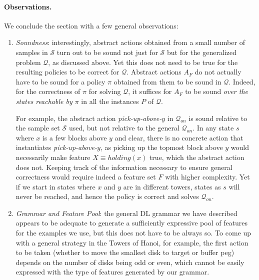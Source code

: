 \documentclass[letterpaper]{article} %
\newcommand{\Q}{\mathcal{Q}}
\begin{document}
% 



\paragraph{Observations.}
We conclude the section with a few general observations:

\begin{enumerate}
\item
\emph{Soundness}: interestingly, abstract actions obtained from a small number of samples in
$\mathcal{S}$ turn out to be sound not just for $\mathcal{S}$ but for the generalized problem $\Q$,
as discussed above. Yet this does not need to be true for the resulting policies to be 
correct for $\Q$.
%
Abstract actions $A_F$ do not actually have to be sound for a policy $\pi$
obtained from them to be sound in $\Q$.
Indeed, for the correctness of $\pi$ for solving $\Q$,
it suffices for $A_F$ to be sound \emph{over the states reachable by $\pi$}
in all the instances $P$ of $\Q$.

For example, the abstract action \emph{pick-up-above-$y$} in $\Q_{on}$
is sound relative to the sample set $\mathcal{S}$ used, but not relative to the general
$\Q_{on}$. In any state $s$ where $x$ is a few blocks above $y$ and clear,
there is no concrete action that instantiates \emph{pick-up-above-$y$},
as picking up the topmost block above $y$ would necessarily make feature $X \equiv holding(x)$
true, which the abstract action does not.
%
Keeping track of the information necessary to ensure general correctness would require indeed 
a feature set $F$ with higher complexity.
Yet if we start in states where $x$ and $y$ are in different towers, 
states as $s$ will never be reached, and hence the policy is correct and solves $\Q_{on}$.


\item
\emph{Grammar and Feature Pool}: the general DL grammar we have described appears to be 
adequate to generate a sufficiently expressive pool of features for the examples we use,
but this does not have to be always so.
To come up with a general strategy in the Towers of Hanoi, for example,
the first action to be taken  (whether to move the smallest disk to target or buffer peg) 
depends on the number of disks being odd or even,
which cannot be easily expressed with the type of features generated by our grammar.


\end{enumerate}
\end{document}
